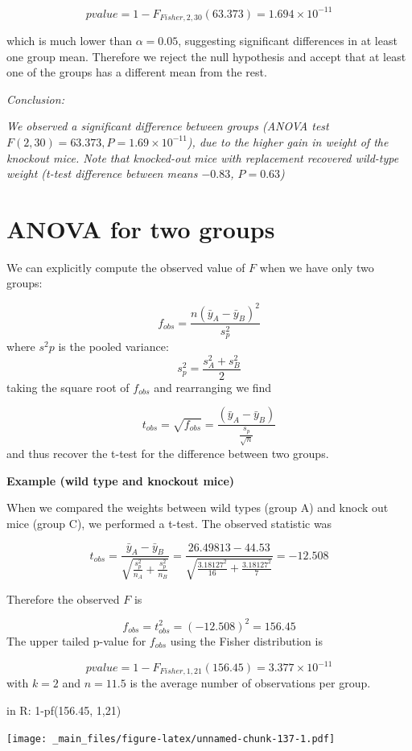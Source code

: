 \documentclass[
]{book}
\begin{document}
\[pvalue=1-F_{Fisher,2,30}(63.373)=1.694 \times 10^{-11}\]

which is much lower than \(\alpha=0.05\), suggesting significant differences in at least one group mean. Therefore we reject the null hypothesis and accept that at least one of the groups has a different mean from the rest.

\emph{Conclusion:}

\emph{We observed a significant difference between groups (ANOVA test \(F(2,30)=63.373, P= 1.69 \times 10^{-11}\)), due to the higher gain in weight of the knockout mice. Note that knocked-out mice with replacement recovered wild-type weight (t-test difference between means \(-0.83\), \(P=0.63\))}

\hypertarget{anova-for-two-groups}{%
\section{ANOVA for two groups}\label{anova-for-two-groups}}

We can explicitly compute the observed value of \(F\) when we have only two groups:

\[f_{obs}=\frac{n(\bar{y}_{A}-\bar{y}_{B})^2}{s^2_p}\]
where \(s^2p\) is the pooled variance:
\[s^2_p= \frac{s_A^2 + s_B^2}{{2}}\]
taking the square root of \(f_{obs}\) and rearranging we find

\[t_{obs}=\sqrt{f_{obs}}=\frac{(\bar{y}_{A}-\bar{y}_{B})}{\frac{s_p}{\sqrt{n}}}\]
and thus recover the t-test for the difference between two groups.

\textbf{Example (wild type and knockout mice)}

When we compared the weights between wild types (group A) and knock out mice (group C), we performed a t-test. The observed statistic was

\[t_{obs}=\frac{\bar{y}_A-\bar{y}_B }{\sqrt{\frac{s^2_p}{n_A}+\frac{s^2_p}{n_B}}}=\frac{26.49813-44.53}{\sqrt{\frac{3.18127^2}{16}+\frac{3.18127^2}{7}}}=-12.508\]

Therefore the observed \(F\) is

\[f_{obs}=t_{obs}^2=(−12.508)^2=156.45\]
The upper tailed p-value for \(f_{obs}\) using the Fisher distribution is

\[pvalue=1-F_{Fisher,1,21}(156.45)=3.377 \times 10^{-11}\] with \(k=2\) and \(n=11.5\) is the average number of observations per group.

in R: 1-pf(156.45, 1,21)

\texttt{[image: \_main\_files/figure-latex/unnamed-chunk-137-1.pdf]}
\end{document}
